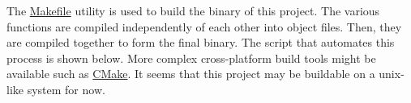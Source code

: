 The \url{Makefile} utility is used to build the binary of this project. The various functions are compiled independently of each other into object files. Then, they are compiled together to form the final binary. The script that automates this process is shown below. More complex cross-platform build tools might be available such as \url{CMake}. It seems that this project may be buildable on a unix-like system for now.
